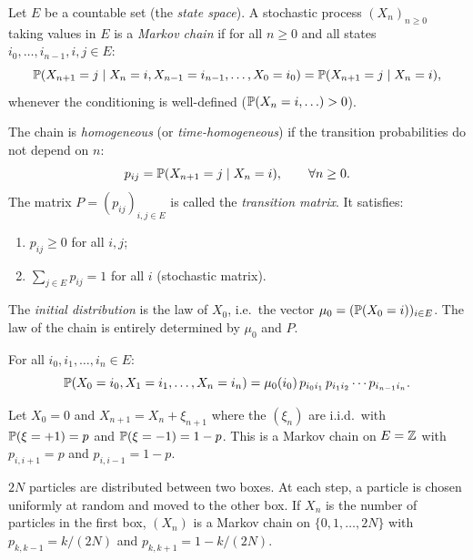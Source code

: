 \begin{definition}
\label{def:markov_chain}
Let $E$ be a countable set (the \emph{state space}). A stochastic process
$(X_n)_{n \geq 0}$ taking values in $E$ is a \emph{Markov chain} if for all
$n \geq 0$ and all states $i_0, \ldots, i_{n-1}, i, j \in E$:
\[
    \mathbb{P}(X_{n+1} = j \mid X_n = i, X_{n-1} = i_{n-1}, \ldots, X_0 = i_0)
    = \mathbb{P}(X_{n+1} = j \mid X_n = i),
\]
whenever the conditioning is well-defined ($\mathbb{P}(X_n = i, \ldots) > 0$).
\end{definition}

\begin{definition}
\label{def:transition_matrix}
The chain is \emph{homogeneous} (or \emph{time-homogeneous}) if the transition
probabilities do not depend on $n$:
\[
    p_{ij} = \mathbb{P}(X_{n+1} = j \mid X_n = i), \qquad \forall n \geq 0.
\]
The matrix $P = (p_{ij})_{i,j \in E}$ is called the \emph{transition matrix}. It
satisfies:
\begin{enumerate}
    \item[(i)] $p_{ij} \geq 0$ for all $i, j$;
    \item[(ii)] $\sum_{j \in E} p_{ij} = 1$ for all $i$ (stochastic matrix).
\end{enumerate}
\end{definition}

\begin{definition}
The \emph{initial distribution} is the law of $X_0$, i.e.\ the vector
$\mu_0 = (\mathbb{P}(X_0 = i))_{i \in E}$. The law of the chain is entirely determined
by $\mu_0$ and $P$.
\end{definition}

\begin{proposition}
For all $i_0, i_1, \ldots, i_n \in E$:
\[
    \mathbb{P}(X_0 = i_0, X_1 = i_1, \ldots, X_n = i_n)
    = \mu_0(i_0)\, p_{i_0 i_1}\, p_{i_1 i_2} \cdots p_{i_{n-1} i_n}.
\]
\end{proposition}

\begin{example}
Let $X_0 = 0$ and $X_{n+1} = X_n + \xi_{n+1}$ where the $(\xi_n)$ are i.i.d.\ with
$\mathbb{P}(\xi = +1) = p$ and $\mathbb{P}(\xi = -1) = 1 - p$. This is a Markov chain on $E = \mathbb{Z}$
with $p_{i,i+1} = p$ and $p_{i,i-1} = 1 - p$.
\end{example}

\begin{example}
$2N$ particles are distributed between two boxes. At each step, a particle is chosen
uniformly at random and moved to the other box. If $X_n$ is the number of particles
in the first box, $(X_n)$ is a Markov chain on $\{0, 1, \ldots, 2N\}$ with
$p_{k,k-1} = k/(2N)$ and $p_{k,k+1} = 1 - k/(2N)$.
\end{example}

